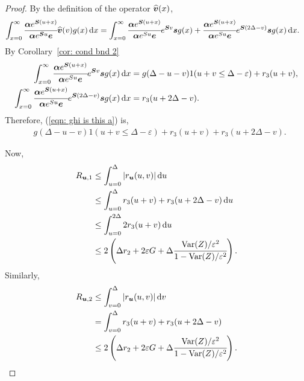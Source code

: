\begin{proof}
	By the definition of the operator \(\widehat{\boldsymbol v}(x)\), 
	\begin{align}
		\int_{x=0}^\infty \cfrac{\boldsymbol \alpha  e^{\boldsymbol{S} (u+x)} }{\boldsymbol \alpha  e^{\boldsymbol{S} u} \boldsymbol e} \widehat{\boldsymbol v}(v)g(x)\, \mathrm{d} x 		
		&=
			\displaystyle\int_{x=0}^\infty 
				\cfrac{
					\boldsymbol \alpha e^{\boldsymbol S(u+x)}
					}{
					\boldsymbol \alpha e^{Su}\boldsymbol e
					} 
				e^{\boldsymbol{S}v}\boldsymbol s g(x)
				+
				\cfrac{
					\boldsymbol \alpha e^{\boldsymbol S(u+x)}
					}{
					\boldsymbol \alpha e^{Su}\boldsymbol e
					} 
				e^{\boldsymbol{S}(2\Delta-v)}\boldsymbol sg(x) \, \mathrm{d} x. \label{eqn: ghi is this a}
	\end{align}
	By Corollary~\ref{cor: cond bnd 2} 
	\begin{align}
		\int_{x=0}^\infty 
				\cfrac{
					\boldsymbol \alpha e^{\boldsymbol S(u+x)}
					}{
					\boldsymbol \alpha e^{Su}\boldsymbol e
					} 
				e^{\boldsymbol{S}v}\boldsymbol s g(x)\, \mathrm{d} x 
				&= g(\Delta-u-v) 1(u+v\leq\Delta-\varepsilon) + r_3 (u+v), \label{eqn: dkskkk2}
		\\
		\int_{x=0}^\infty\cfrac{
					\boldsymbol \alpha e^{\boldsymbol S(u+x)}
					}{
					\boldsymbol \alpha e^{Su}\boldsymbol e
					} 
				e^{\boldsymbol{S}(2\Delta-v)}\boldsymbol sg(x) \, \mathrm{d} x 
				&= r_3 (u+2\Delta - v).
	\end{align}
	Therefore, (\ref{eqn: ghi is this a}) is, 
	\begin{align}
		&g(\Delta-u-v) 1(u+v\leq\Delta-\varepsilon) + r_3 (u+v) + r_3 (u+2\Delta - v).
	\end{align}	
	
	Now,
	\begin{align*}
		R_{{{\boldsymbol u}},1}&\leq \int_{u=0}^{\Delta}| r_{{\boldsymbol u}}(u,v)|\, \mathrm{d} u
		\\& \leq \int_{u=0}^{\Delta} r_3 (u+v) + r_3 (u+2\Delta - v) \, \mathrm{d} u
		\\& \leq \int_{u=0}^{2\Delta} 2r_3 (u+v)\, \mathrm{d} u
		\\&\leq 2\left(\Delta r_2 + 2\varepsilon G + \Delta\cfrac{\mathrm{Var}(Z)/\varepsilon^2}{1-\mathrm{Var}(Z)/\varepsilon^2}\right).
	\end{align*}
	Similarly, 
	\begin{align*}
		R_{{{\boldsymbol u}},2}&\leq \int_{v=0}^{\Delta}| r_{{\boldsymbol u}}(u,v)|\, \mathrm{d} v
		\\&= \int_{v=0}^{\Delta} r_3(u+v) + r_3(u+2\Delta-v) 
		\\& \leq 2\left(\Delta r_2 + 2\varepsilon G + \Delta\cfrac{\mathrm{Var}(Z)/\varepsilon^2}{1-\mathrm{Var}(Z)/\varepsilon^2}\right).
	\end{align*}
\end{proof}

